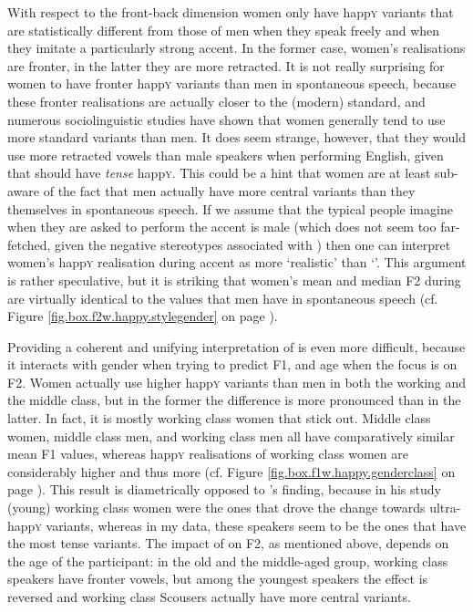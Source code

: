 With respect to the front-back dimension women only have happ\textsc{y} variants that are statistically different from those of men when they speak freely and when they imitate a particularly strong  accent.
In the former case, women's realisations are fronter, in the latter they are more retracted.
It is not really surprising for women to have fronter happ\textsc{y} variants than men in spontaneous speech, because these fronter realisations are actually closer to the (modern) standard, and numerous sociolinguistic studies have shown that women generally tend to use more standard variants than men.
It does seem strange, however, that they would use more retracted vowels than male speakers when performing  English, given that   should have \emph{tense} happ\textsc{y}.
This could be a hint that women are at least sub- aware of the fact that men actually have more central variants than they themselves in spontaneous speech.
If we assume that the typical  people imagine when they are asked to perform the accent is male (which does not seem too far-fetched, given the negative stereotypes associated with ) then one can interpret women's happ\textsc{y} realisation during accent  as more `realistic' than `'.
This argument is rather speculative, but it is striking that women's mean and median F2 during  are virtually identical to the values that men have in spontaneous speech (cf. Figure \ref{fig.box.f2w.happy.stylegender} on page \pageref{fig.box.f2w.happy.stylegender}).

Providing a coherent and unifying interpretation of  is even more difficult, because it interacts with gender when trying to predict F1, and age when the focus is on F2.
Women actually use higher happ\textsc{y} variants than men in both the working and the middle class, but in the former the difference is more pronounced than in the latter.
In fact, it is mostly working class women that stick out.
Middle class women, middle class men, and working class men all have comparatively similar mean F1 values, whereas happ\textsc{y} realisations of working class women are considerably higher and thus more  (cf. Figure \ref{fig.box.f1w.happy.genderclass} on page \pageref{fig.box.f1w.happy.genderclass}).
This result is diametrically opposed to \textcite{flynn2010}'s finding, because in his study (young) working class women were the ones that drove the change towards ultra- happ\textsc{y} variants, whereas in my data, these speakers seem to be the ones that have the most tense variants.
The impact of  on F2, as mentioned above, depends on the age of the participant: in the old and the middle-aged group, working class speakers have fronter vowels, but among the youngest speakers the effect is reversed and working class Scousers actually have more central variants.

